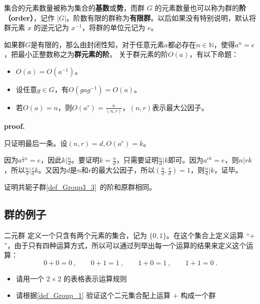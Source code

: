 集合的元素数量被称为集合的\textbf{基数}或\textbf{势}，而群 $G$ 的元素数量也可以称为群的\textbf{阶（order）}，记作 $|G|$。阶数有限的群称为\textbf{有限群}。以后如果没有特别说明，默认将群元素 $x$ 的逆元记为 $x^{-1}$，将群的单位元记为 $e$。

如果群$G$是有限的，那么由封闭性知，对于任意元素$a$都必存在$n\in \mathbb N$，使得$a^n=e$，把最小正整数称之为\textbf{群元素的阶}。
关于群元素的阶$O(a)$，有以下命题：
\begin{theorem}{}
\begin{itemize}
\item $O(a)=O(a^{-1})$。
\item 设任意$g\in G$，有$O(gag^{-1})=O(a)$。
\item 若$O(a)=n$，则$O(a^r)=\frac{n}{(n,r)}$，$(n,r)$表示最大公因子。
\end{itemize}
\end{theorem}
\textbf{proof.}

只证明最后一条。设$(n,r)=d,O(a^r)=k$。

因为$a^{\frac{r}{d}n}=e$，因此$k|\frac{n}{d}$。要证明$k=\frac{n}{d}$，只需要证明$\frac{n}{d}|k$即可。因为$a^{rk}=e$，则$n|rk$，所以$\frac{n}{d}|\frac{r}{d}k$。又因为$d$是$n$和$r$的最大公因子，所以$(\frac{n}{d},\frac{r}{d})=1$，则$\frac{n}{d}|k$，证毕。
\begin{exercise}{}
证明共轭子群\autoref{def_Group3_3}~的阶和原群相同。
\end{exercise}
\subsection{群的例子}

\begin{exercise}{二元群}\label{exe_Group_1}
定义一个只含有两个元素的集合，记为 $\{0, 1\}$。在这个集合上定义运算 “$+$”，由于只有四种运算方式，所以可以通过列举出每一个运算的结果来定义这个运算：
\begin{equation}\label{eq_Group_1}
0+0=0~, \qquad 0+1=1~, \qquad 1+0=1~, \qquad 1+1=0~.
\end{equation}
\begin{itemize}
\item 请用一个 $2\times2$ 的表格表示运算规则
\item 请根据\autoref{def_Group_1} 验证这个二元集合配上运算 $+$ 构成一个群
\end{itemize}
\end{exercise}

